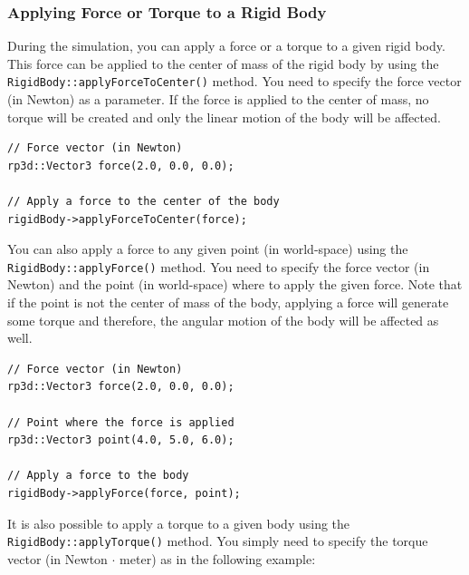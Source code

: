 \documentclass[a4paper,12pt]{article}
\begin{document}
    \subsubsection{Applying Force or Torque to a Rigid Body}

    During the simulation, you can apply a force or a torque to a given rigid body. This force can be applied to the center of mass of the rigid body by using the
    \texttt{RigidBody::\allowbreak applyForceToCenter()} method. You need to specify the force vector (in Newton) as a parameter. If the force is applied to the center of mass, no
    torque will be created and only the linear motion of the body will be affected. \\

    \begin{lstlisting}
// Force vector (in Newton)
rp3d::Vector3 force(2.0, 0.0, 0.0);

// Apply a force to the center of the body
rigidBody->applyForceToCenter(force);
  \end{lstlisting}

    \vspace{0.6cm}

    \begin{sloppypar}
        You can also apply a force to any given point (in world-space) using the \texttt{RigidBody::applyForce()} method. You need to specify the force vector (in Newton) and the point
        (in world-space) where to apply the given force. Note that if the point is not the center of mass of the body, applying a force will generate some torque and therefore, the
        angular motion of the body will be affected as well. \\
    \end{sloppypar}

    \begin{lstlisting}
// Force vector (in Newton)
rp3d::Vector3 force(2.0, 0.0, 0.0);

// Point where the force is applied
rp3d::Vector3 point(4.0, 5.0, 6.0);

// Apply a force to the body
rigidBody->applyForce(force, point);
  \end{lstlisting}

    \vspace{0.6cm}

     \begin{sloppypar}
        It is also possible to apply a torque to a given body using the \texttt{RigidBody::applyTorque()} method. You simply need to specify the torque vector (in Newton $\cdot$ meter) as
        in the following example: \\
     \end{sloppypar}
\end{document}
